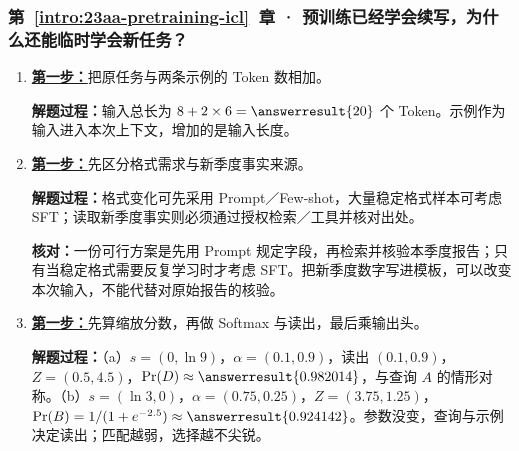 \subsubsection*{第~\ref*{intro:23aa-pretraining-icl}~章 · 预训练已经学会续写，为什么还能临时学会新任务？}
\begin{enumerate}[label={},leftmargin=4.8em,itemsep=4pt]
\item[\textbf{C-090.}] \leavevmode{}\label{solution:C-090}\label{solution:icl-context-budget}\hyperref[exercise:icl-context-budget]{\textbf{第一步：}}把原任务与两条示例的 Token 数相加。\par\nobreak
\textbf{解题过程：}输入总长为 $8+2\times6=\answerresult{20}$ 个 Token。示例作为输入进入本次上下文，增加的是输入长度。
\item[\textbf{C-091.}] \leavevmode{}\label{solution:C-091}\label{solution:prompt-or-training}\hyperref[exercise:prompt-or-training]{\textbf{第一步：}}先区分格式需求与新季度事实来源。\par\nobreak\textbf{解题过程：}格式变化可先采用 Prompt／Few-shot，大量稳定格式样本可考虑 SFT；读取新季度事实则必须通过授权检索／工具并核对出处。\par\textbf{核对：}一份可行方案是先用 Prompt 规定字段，再检索并核验本季度报告；只有当稳定格式需要反复学习时才考虑 SFT。把新季度数字写进模板，可以改变本次输入，不能代替对原始报告的核验。
\item[\textbf{C-092.}] \leavevmode{}\label{solution:C-092}\label{solution:icl-query-transfer}\hyperref[exercise:icl-query-transfer]{\textbf{第一步：}}先算缩放分数，再做 Softmax 与读出，最后乘输出头。\par\nobreak
\textbf{解题过程：}（a）$s=(0,\ln9)$，$\alpha=(0.1,0.9)$，读出 $(0.1,0.9)$，$Z=(0.5,4.5)$，$\Pr(D)\approx\answerresult{0.982014}$，与查询 $A$ 的情形对称。（b）$s=(\ln3,0)$，$\alpha=(0.75,0.25)$，$Z=(3.75,1.25)$，$\Pr(B)=1/(1+e^{-2.5})\approx\answerresult{0.924142}$。参数没变，查询与示例决定读出；匹配越弱，选择越不尖锐。
\end{enumerate}
